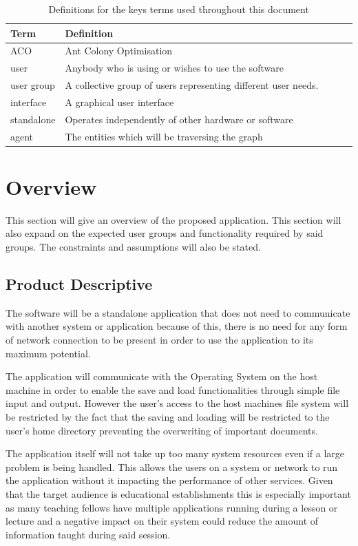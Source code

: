 \begin{table}[h]
\centering
\begin{tabular}{|l|l|lll}
\textbf{Term} & \textbf{Definition} \\ 
\hline
ACO & Ant Colony Optimisation \\ 
user & Anybody who is using or wishes to use the software \\ 
user group & A collective group of users representing different user needs. \\ 
interface &A graphical user interface \\
standalone &Operates independently of other hardware or software\\
agent &The entities which will be traversing the graph \\
\end{tabular}
\caption[Document Definitions]{Definitions for the keys terms used throughout this document}
\end{table}

\section{Overview}

This section will give an overview of the proposed application. This section will also expand on the expected user groups and functionality required by said groups. The constraints and assumptions will also be stated.

\subsection{Product Descriptive}

The software will be a standalone application that does not need to communicate with another system or application because of this, there is no need for any form of network connection to be present in order to use the application to its maximum potential.

The application will communicate with the Operating System on the host machine in order to enable the save and load functionalities through simple file input and output. However the user’s access to the host machines file system will be restricted by the fact that the saving and loading will be restricted to the user’s home directory preventing the overwriting of important documents.

The application itself will not take up too many system resources even if a large problem is being handled. This allows the users on a system or network to run the application without it impacting the performance of other services. Given that the target audience is educational establishments this is especially important as many teaching fellows have multiple applications running during a lesson or lecture and a negative impact on their system could reduce the amount of information taught during said session.


